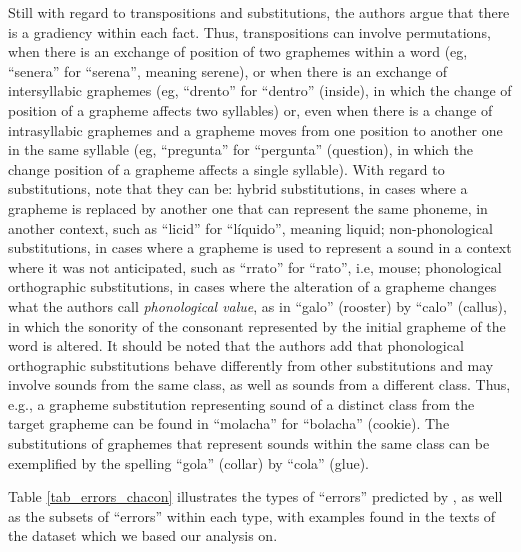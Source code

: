 Still with regard to transpositions and substitutions, the authors argue that there is a gradiency within each fact. Thus, transpositions can involve permutations, when there is an exchange of position of two graphemes within a word (eg, ``senera'' for ``serena'', meaning serene), or when there is an exchange of intersyllabic graphemes (eg, ``drento'' for ``dentro'' (inside), in which the change of position of a grapheme affects two syllables) or, even when there is a change of intrasyllabic graphemes and a grapheme moves from one position to another one in the same syllable (eg, ``pregunta'' for ``pergunta'' (question), in which the change position of a grapheme affects a single syllable). With regard to substitutions, \citet{Chacon2018} note that they can be: hybrid substitutions, in cases where a grapheme is replaced by another one that can represent the same phoneme, in another context, such as ``licid'' for ``líquido'', meaning liquid; non-phonological substitutions, in cases where a grapheme is used to represent a sound in a context where it was not anticipated, such as ``rrato'' for ``rato'', i.e, mouse; phonological orthographic substitutions, in cases where the alteration of a grapheme changes what the authors call \emph{phonological value}, as in ``galo'' (rooster) by ``calo'' (callus), in which the sonority of the consonant represented by the initial grapheme of the word is altered. It should be noted that the authors add that phonological orthographic substitutions behave differently from other substitutions and may involve sounds from the same class, as well as sounds from a different class. Thus, e.g., a grapheme substitution representing sound of a distinct class from the target grapheme can be found in ``molacha'' for ``bolacha'' (cookie). The substitutions of graphemes that represent sounds within the same class can be exemplified by the spelling ``gola'' (collar) by ``cola'' (glue).

Table \ref{tab_errors_chacon} illustrates the types of ``errors'' predicted by \citet{Chacon2018}, as well as the subsets of ``errors'' within each type, with examples found in the texts of the dataset which we based our analysis on.

